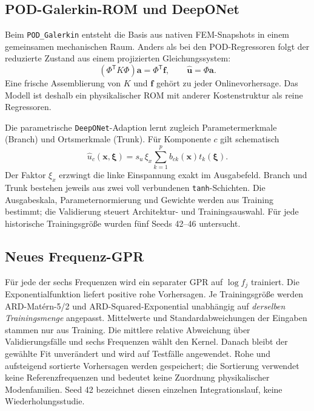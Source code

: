 \documentclass[11pt,a4paper]{article}
\begin{document}
\subsection{POD-Galerkin-ROM und DeepONet}
Beim \texttt{POD\_Galerkin} entsteht die Basis aus nativen FEM-Snapshots in einem gemeinsamen mechanischen Raum. Anders als bei den POD-Regressoren folgt der reduzierte Zustand aus einem projizierten Gleichungssystem:
\begin{equation}
  (\Phi^\mathsf T K\Phi)\boldsymbol a=\Phi^\mathsf T\boldsymbol f,\qquad
  \widehat{\boldsymbol u}=\Phi\boldsymbol a.
\end{equation}
Eine frische Assemblierung von $K$ und $\boldsymbol f$ gehört zu jeder Onlinevorhersage. Das Modell ist deshalb ein physikalischer ROM mit anderer Kostenstruktur als reine Regressoren.

Die parametrische \texttt{DeepONet}-Adaption lernt zugleich Parametermerkmale (Branch) und Ortsmerkmale (Trunk). Für Komponente $c$ gilt schematisch
\begin{equation}
 \widehat u_c(\boldsymbol x,\boldsymbol\xi)
 =s_u\,\xi_x\sum_{k=1}^{p}b_{ck}(\boldsymbol x)t_k(\boldsymbol\xi).
\end{equation}
Der Faktor $\xi_x$ erzwingt die linke Einspannung exakt im Ausgabefeld. Branch und Trunk bestehen jeweils aus zwei voll verbundenen \texttt{tanh}-Schichten. Die Ausgabeskala, Parameternormierung und Gewichte werden aus Training bestimmt; die Validierung steuert Architektur- und Trainingsauswahl. Für jede historische Trainingsgröße wurden fünf Seeds 42--46 untersucht.

\subsection{Neues Frequenz-GPR}
Für jede der sechs Frequenzen wird ein separater GPR auf $\log f_j$ trainiert. Die Exponentialfunktion liefert positive rohe Vorhersagen. Je Trainingsgröße werden ARD-Matérn-5/2 und ARD-Squared-Exponential unabhängig auf \emph{derselben Trainingsmenge} angepasst. Mittelwerte und Standardabweichungen der Eingaben stammen nur aus Training. Die mittlere relative Abweichung über Validierungsfälle und sechs Frequenzen wählt den Kernel. Danach bleibt der gewählte Fit unverändert und wird auf Testfälle angewendet. Rohe und aufsteigend sortierte Vorhersagen werden gespeichert; die Sortierung verwendet keine Referenzfrequenzen und bedeutet keine Zuordnung physikalischer Modenfamilien. Seed 42 bezeichnet diesen einzelnen Integrationslauf, keine Wiederholungsstudie.
\end{document}
